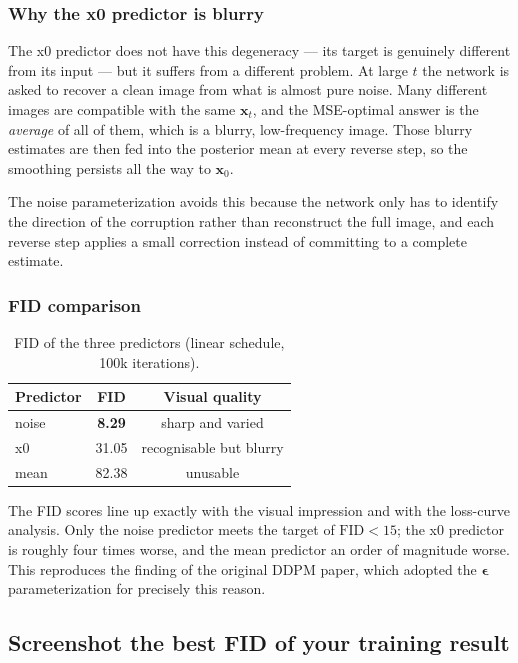 \documentclass[a4paper]{article} %
\begin{document}
\subsubsection{Why the x0 predictor is blurry}

The x0 predictor does not have this degeneracy --- its target is genuinely different from its input
--- but it suffers from a different problem. At large $t$ the network is asked to recover a clean
image from what is almost pure noise. Many different images are compatible with the same
$\mathbf{x}_t$, and the MSE-optimal answer is the \emph{average} of all of them, which is a blurry,
low-frequency image. Those blurry estimates are then fed into the posterior mean at every reverse
step, so the smoothing persists all the way to $\mathbf{x}_0$.

The noise parameterization avoids this because the network only has to identify the direction of
the corruption rather than reconstruct the full image, and each reverse step applies a small
correction instead of committing to a complete estimate.

\subsubsection{FID comparison}

\begin{table}[H]
\centering
\caption{FID of the three predictors (linear schedule, 100k iterations).}
\label{tab:fid_predictor}
\begin{tabular}{lcc}
\toprule
\textbf{Predictor} & \textbf{FID} & \textbf{Visual quality} \\
\midrule
noise & \textbf{8.29} & sharp and varied \\
x0    & 31.05 & recognisable but blurry \\
mean  & 82.38 & unusable \\
\bottomrule
\end{tabular}
\end{table}

The FID scores line up exactly with the visual impression and with the loss-curve analysis. Only the
noise predictor meets the target of $\text{FID} < 15$; the x0 predictor is roughly four times worse,
and the mean predictor an order of magnitude worse. This reproduces the finding of the original DDPM
paper, which adopted the $\boldsymbol{\epsilon}$ parameterization for precisely this reason.

\subsection{Screenshot the best FID of your training result}
\end{document}

